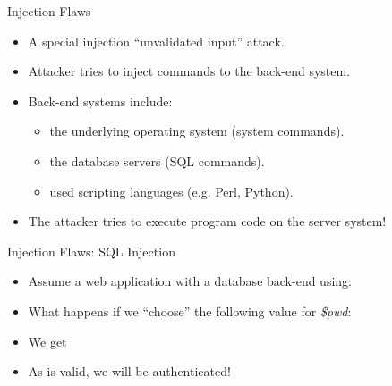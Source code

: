 \documentclass{beamer}
\begin{document}
\begin{slide}{Injection Flaws}
  \begin{itemize}\itemsep=2ex
    \item A special injection ``unvalidated  input'' attack.
    \item Attacker tries to inject commands to the back-end system.
    \item Back-end systems include:
    \begin{itemize}\itemsep=2ex
      \item the underlying operating system (system commands).
      \item the database servers (SQL commands).
      \item used scripting languages (e.g. Perl, Python).
    \end{itemize}
    \item The attacker tries to execute program code on the server system!
  \end{itemize}
\end{slide}
\begin{slide}{Injection Flaws: SQL Injection}
  \begin{itemize}\itemsep=1.5ex
    \item Assume a web application with a database back-end using:\\[1ex]
      \pause
   \item What happens if we ``choose'' the following value for \emph{\$pwd}: 

 \pause
   \item We get\\[1ex]
 \pause
   \item As \textsf{} is valid, \alert{we will be authenticated!}
 \end{itemize}
\end{slide}
\end{document}
